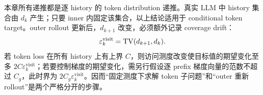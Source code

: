 本章所有递推都是逐 history 的 token distribution 递推。真实 LLM 中 history 集合由 $d_k$ 产生；只要 inner 内固定该集合，以上结论适用于 conditional token target。outer rollout 更新后，$d_{k+1}$ 改变，必须额外记录 coverage drift：
\begin{equation*}
 \varepsilon_k^{\mathrm{visit}}=\operatorname{TV}(d_{k+1},d_k).
\end{equation*}
若 token loss 在所有 history 上有上界 $C$，则访问测度改变使目标值的期望变化至多 $2C\varepsilon_k^{\mathrm{visit}}$；若要控制梯度的期望变化，需另行假设逐 prefix 梯度向量的范数不超过 $C_g$，此时界为 $2C_g\varepsilon_k^{\mathrm{visit}}$。因而“固定测度下求解 token 子问题”和“outer 重新 rollout”是两个严格分开的步骤。
